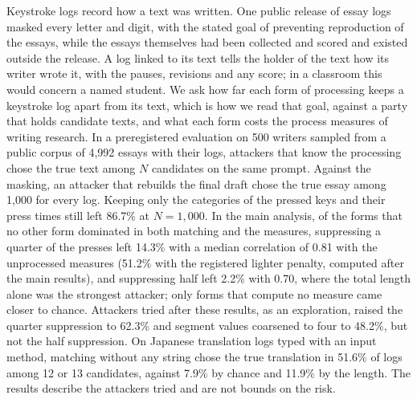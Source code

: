   Keystroke logs record how a text was written. One public release of essay logs masked every letter and digit, with
  the stated goal of preventing reproduction of the essays, while the essays themselves had been collected and scored
  and existed outside the release. A log linked to its text tells the holder of the text how its writer wrote it, with the
  pauses, revisions and any score; in a classroom this would concern a named student. We ask how far each form of
  processing keeps a keystroke log apart from its text, which is how we read that goal, against a party that holds
  candidate texts, and what each form costs the process measures of writing research. In a preregistered evaluation on
  500 writers sampled from a public corpus of 4,992 essays with their logs, attackers that know the processing chose
  the true text among $N$ candidates on the same prompt. Against the masking, an attacker that rebuilds the final
  draft chose the true essay among 1,000 for every log. Keeping only the categories of the pressed keys and their press
  times still left 86.7\% at $N = 1{,}000$. In the main analysis, of the forms that no other form dominated in both matching and the measures, suppressing a
  quarter of the presses left 14.3\% with a median correlation of 0.81 with the unprocessed measures (51.2\% with the
  registered lighter penalty, computed after the main results), and suppressing half left 2.2\% with 0.70, where the total length alone was the
  strongest attacker; only forms that compute no measure came closer to chance. Attackers tried after these results,
  as an exploration, raised the quarter suppression to 62.3\% and segment values coarsened to four to 48.2\%, but
  not the half suppression. On Japanese translation logs typed with an input method, matching without any string chose the true translation
  in 51.6\% of logs among 12 or 13 candidates, against 7.9\% by chance and 11.9\% by the length. The results describe
  the attackers tried and are not bounds on the risk.
